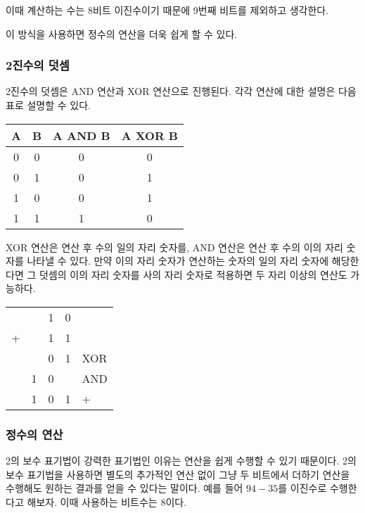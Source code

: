 \documentclass{article}
\begin{document}
이때 계산하는 수는 8비트 이진수이기 때문에 9번째 비트를 제외하고 생각한다.

이 방식을 사용하면 정수의 연산을 더욱 쉽게 할 수 있다.

\subsubsection{2진수의 덧셈}

2진수의 덧셈은 AND 연산과 XOR 연산으로 진행된다. 각각 연산에 대한 설명은 다음 표로 설명할
수 있다.

\begin{center}
    \begin{tabular}{cc|cc}
        A & B & A AND B & A XOR B \\
        \hline
        0 & 0 & 0 & 0 \\
        0 & 1 & 0 & 1 \\
        1 & 0 & 0 & 1 \\
        1 & 1 & 1 & 0
    \end{tabular}
\end{center}

XOR 연산은 연산 후 수의 일의 자리 숫자를, AND 연산은 연산 후 수의 이의 자리 숫자를 나타낼 수
있다. 만약 이의 자리 숫자가 연산하는 숫자의 일의 자리 숫자에 해당한다면 그 덧셈의 이의 자리
숫자를 사의 자리 숫자로 적용하면 두 자리 이상의 연산도 가능하다.

\begin{center}
    \begin{tabular}{ccccl}
          &   & 1 & 0 & \\
        + &   & 1 & 1 & \\
        \hline
          &   & 0 & 1 & XOR \\
          & 1 & 0 &   & AND \\
        \hline
          & 1 & 0 & 1 & +
    \end{tabular}
\end{center}

\subsubsection{정수의 연산}

2의 보수 표기법이 강력한 표기법인 이유는 연산을 쉽게 수행할 수 있기 때문이다.
2의 보수 표기법을 사용하면 별도의 추가적인 연산 없이 그냥 두 비트에서 더하기 연산을 수행해도
원하는 결과를 얻을 수 있다는 말이다. 예를 들어 $94 - 35$를 이진수로
수행한다고 해보자. 이때 사용하는 비트수는 8이다.
\end{document}
